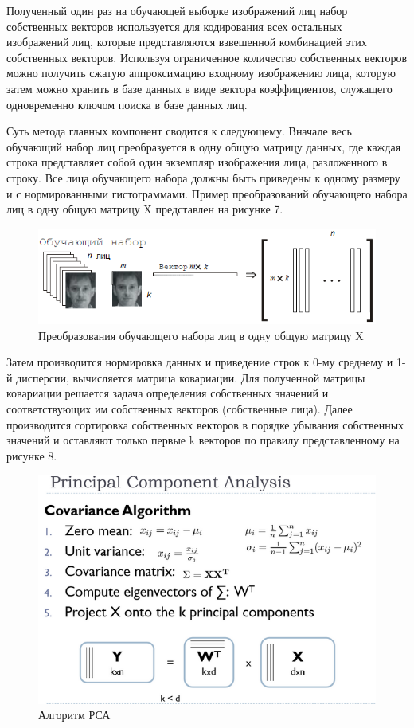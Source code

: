 \documentclass[12pt,a4paper]{article}					%
\begin{document}
Полученный один раз на обучающей выборке изображений лиц набор собственных векторов используется для кодирования всех остальных изображений лиц, которые представляются взвешенной комбинацией этих собственных векторов. 
Используя ограниченное количество собственных векторов можно получить сжатую аппроксимацию входному изображению лица, которую затем можно хранить в базе данных в виде вектора коэффициентов, служащего одновременно ключом поиска в базе данных лиц. 

Суть метода главных компонент сводится к следующему. 
Вначале весь обучающий набор лиц преобразуется в одну общую матрицу данных, где каждая строка представляет собой один экземпляр изображения лица, разложенного в строку. 
Все лица обучающего набора должны быть приведены к одному размеру и с нормированными гистограммами. 
Пример преобразований обучающего набора лиц в одну общую матрицу X представлен на рисунке 7.

\begin{figure}[h!]
\centering
\includegraphics[scale=0.70]{res/ex_set_faces}
\caption{Преобразования обучающего набора лиц в одну общую матрицу X}
\end{figure}

Затем производится нормировка данных и приведение строк к 0-му среднему и 1-й дисперсии, вычисляется матрица ковариации. 
Для полученной матрицы ковариации решается задача определения собственных значений и соответствующих им собственных векторов (собственные лица).
Далее производится сортировка собственных векторов в порядке убывания собственных значений и оставляют только первые k векторов по правилу представленному на рисунке 8.

\begin{figure}[h!]
\centering
\includegraphics[scale=0.70]{res/pca_rules}
\caption{Алгоритм РСА}
\end{figure}
\end{document}

